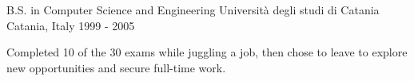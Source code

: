 

\begin{cventries}

  \cventry
  {B.S. in Computer Science and Engineering} %
  {Università degli studi di Catania} %
  {Catania, Italy} %
  {1999 - 2005} %
  {
    \begin{cvitems} %
      Completed 10 of the 30 exams while juggling a job, then chose to leave to explore new opportunities and secure full-time work.
    \end{cvitems}
  }

\end{cventries}
